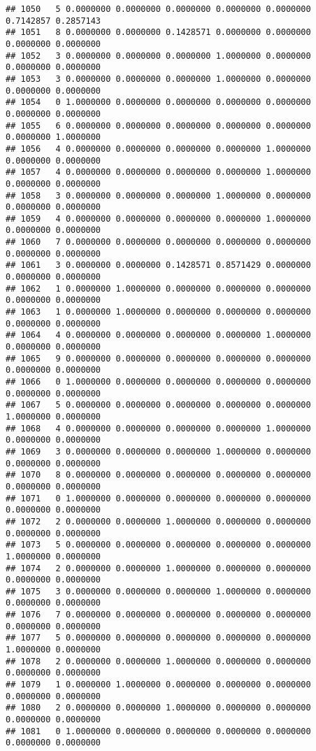 \documentclass[
]{article}
\begin{document}
\begin{verbatim}
## 1050   5 0.0000000 0.0000000 0.0000000 0.0000000 0.0000000 0.7142857 0.2857143
## 1051   8 0.0000000 0.0000000 0.1428571 0.0000000 0.0000000 0.0000000 0.0000000
## 1052   3 0.0000000 0.0000000 0.0000000 1.0000000 0.0000000 0.0000000 0.0000000
## 1053   3 0.0000000 0.0000000 0.0000000 1.0000000 0.0000000 0.0000000 0.0000000
## 1054   0 1.0000000 0.0000000 0.0000000 0.0000000 0.0000000 0.0000000 0.0000000
## 1055   6 0.0000000 0.0000000 0.0000000 0.0000000 0.0000000 0.0000000 1.0000000
## 1056   4 0.0000000 0.0000000 0.0000000 0.0000000 1.0000000 0.0000000 0.0000000
## 1057   4 0.0000000 0.0000000 0.0000000 0.0000000 1.0000000 0.0000000 0.0000000
## 1058   3 0.0000000 0.0000000 0.0000000 1.0000000 0.0000000 0.0000000 0.0000000
## 1059   4 0.0000000 0.0000000 0.0000000 0.0000000 1.0000000 0.0000000 0.0000000
## 1060   7 0.0000000 0.0000000 0.0000000 0.0000000 0.0000000 0.0000000 0.0000000
## 1061   3 0.0000000 0.0000000 0.1428571 0.8571429 0.0000000 0.0000000 0.0000000
## 1062   1 0.0000000 1.0000000 0.0000000 0.0000000 0.0000000 0.0000000 0.0000000
## 1063   1 0.0000000 1.0000000 0.0000000 0.0000000 0.0000000 0.0000000 0.0000000
## 1064   4 0.0000000 0.0000000 0.0000000 0.0000000 1.0000000 0.0000000 0.0000000
## 1065   9 0.0000000 0.0000000 0.0000000 0.0000000 0.0000000 0.0000000 0.0000000
## 1066   0 1.0000000 0.0000000 0.0000000 0.0000000 0.0000000 0.0000000 0.0000000
## 1067   5 0.0000000 0.0000000 0.0000000 0.0000000 0.0000000 1.0000000 0.0000000
## 1068   4 0.0000000 0.0000000 0.0000000 0.0000000 1.0000000 0.0000000 0.0000000
## 1069   3 0.0000000 0.0000000 0.0000000 1.0000000 0.0000000 0.0000000 0.0000000
## 1070   8 0.0000000 0.0000000 0.0000000 0.0000000 0.0000000 0.0000000 0.0000000
## 1071   0 1.0000000 0.0000000 0.0000000 0.0000000 0.0000000 0.0000000 0.0000000
## 1072   2 0.0000000 0.0000000 1.0000000 0.0000000 0.0000000 0.0000000 0.0000000
## 1073   5 0.0000000 0.0000000 0.0000000 0.0000000 0.0000000 1.0000000 0.0000000
## 1074   2 0.0000000 0.0000000 1.0000000 0.0000000 0.0000000 0.0000000 0.0000000
## 1075   3 0.0000000 0.0000000 0.0000000 1.0000000 0.0000000 0.0000000 0.0000000
## 1076   7 0.0000000 0.0000000 0.0000000 0.0000000 0.0000000 0.0000000 0.0000000
## 1077   5 0.0000000 0.0000000 0.0000000 0.0000000 0.0000000 1.0000000 0.0000000
## 1078   2 0.0000000 0.0000000 1.0000000 0.0000000 0.0000000 0.0000000 0.0000000
## 1079   1 0.0000000 1.0000000 0.0000000 0.0000000 0.0000000 0.0000000 0.0000000
## 1080   2 0.0000000 0.0000000 1.0000000 0.0000000 0.0000000 0.0000000 0.0000000
## 1081   0 1.0000000 0.0000000 0.0000000 0.0000000 0.0000000 0.0000000 0.0000000

\end{verbatim}
\end{document}
